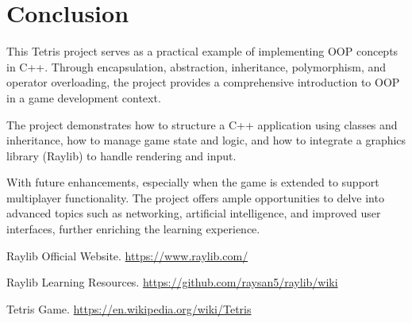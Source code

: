 \documentclass{article}
\begin{document}
\section{Conclusion}

This Tetris project serves as a practical example of implementing OOP concepts in C++. Through encapsulation, abstraction, inheritance, polymorphism, and operator overloading, the project provides a comprehensive introduction to OOP in a game development context.

The project demonstrates how to structure a C++ application using classes and inheritance, how to manage game state and logic, and how to integrate a graphics library (Raylib) to handle rendering and input.

With future enhancements, especially when the game is extended to support multiplayer functionality. The project offers ample opportunities to delve into advanced topics such as networking, artificial intelligence, and improved user interfaces, further enriching the learning experience.
\newpage
\begin{thebibliography}{9}

Raylib Official Website. \url{https://www.raylib.com/}

Raylib Learning Resources. \url{https://github.com/raysan5/raylib/wiki}

Tetris Game. \url{https://en.wikipedia.org/wiki/Tetris}
\end{thebibliography}
\end{document}
